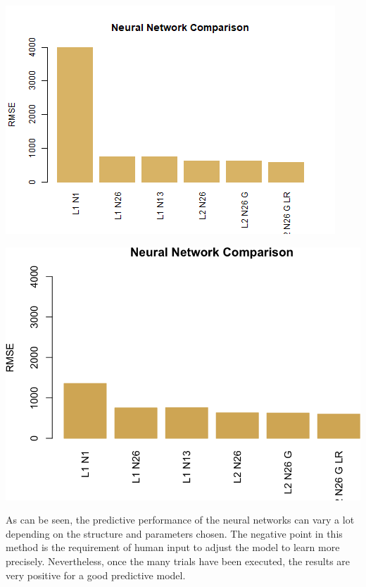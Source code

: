 \documentclass[
  paper=a4,
  ,captions=tableheading
]{scrartcl}
\begin{document}
\begin{center}\includegraphics{Diamonds_PDF_files/figure-latex/NN Summary-1} \end{center}

\begin{center}\includegraphics{Diamonds_PDF_files/figure-latex/NN Summary-2} \end{center}

As can be seen, the predictive performance of the neural networks can
vary a lot depending on the structure and parameters chosen. The
negative point in this method is the requirement of human input to
adjust the model to learn more precisely. Nevertheless, once the many
trials have been executed, the results are very positive for a good
predictive model.
\end{document}

